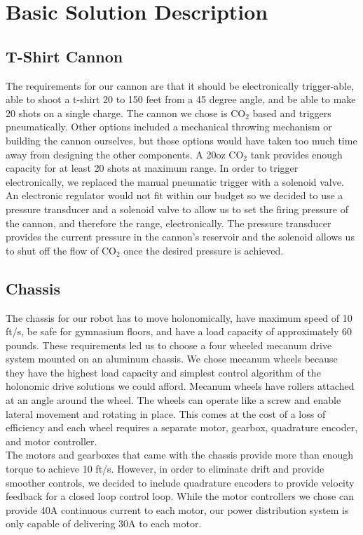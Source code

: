 \documentclass[letterpaper,12pt]{article}
\begin{document}
\section{Basic Solution Description}
\label{sec:basicsoldesc}

\subsection{T-Shirt Cannon}
The requirements for our cannon are that it should be electronically
trigger-able, able to shoot a t-shirt 20 to 150 feet from a 45 degree angle,
and be able to make 20 shots on a single charge. The cannon we chose is CO$_2$
based and triggers pneumatically. Other options included a mechanical throwing
mechanism or building the cannon ourselves, but those options would have taken
too much time away from designing the other components. A 20oz CO$_2$ tank
provides enough capacity for at least 20 shots at maximum range. In order to
trigger electronically, we replaced the manual pneumatic trigger with
a solenoid valve. An electronic regulator would not fit within our budget so we
decided to use a pressure transducer and a solenoid valve to allow us to set
the firing pressure of the cannon, and therefore the range, electronically. The
pressure transducer provides the current pressure in the cannon's reservoir and
the solenoid allows us to shut off the flow of CO$_2$ once the desired pressure
is achieved.\\

\subsection{Chassis}
The chassis for our robot has to move holonomically, have maximum speed of 10
ft/s, be safe for gymnasium floors, and have a load capacity of approximately
60 pounds. These requirements led us to choose a four wheeled mecanum drive
system mounted on an aluminum chassis. We chose mecanum wheels because they
have the highest load capacity and simplest control algorithm of the holonomic
drive solutions we could afford. Mecanum wheels have rollers attached at an
angle around the wheel. The wheels can operate like a screw and enable lateral
movement and rotating in place. This comes at the cost of a loss of efficiency
and each wheel requires a separate motor, gearbox, quadrature encoder, and
motor controller.\\

The motors and gearboxes that came with the chassis provide more than enough
torque to achieve 10 ft/s. However, in order to eliminate drift and provide
smoother controls, we decided to include quadrature encoders to provide
velocity feedback for a closed loop control loop. While the motor controllers
we chose can provide 40A continuous current to each motor, our power
distribution system is only capable of delivering 30A to each motor.\\
\end{document}
